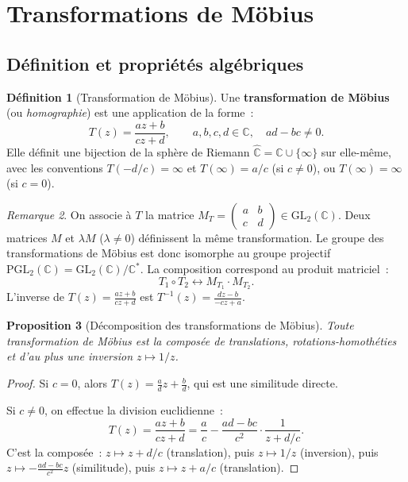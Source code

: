 \documentclass[12pt,a4paper,openany]{book}
\theoremstyle{definition}
\newtheorem{definition}{Définition}[chapter]
\theoremstyle{plain}
\newtheorem{proposition}[definition]{Proposition}
\theoremstyle{remark}
\newtheorem{remarque}[definition]{Remarque}
\newcommand{\C}{\mathbb{C}}
\begin{document}
\section{Transformations de Möbius}\label{sec:mobius}

\subsection{Définition et propriétés algébriques}

\begin{definition}[Transformation de Möbius]\label{def:mobius}
Une \textbf{transformation de Möbius} (ou \emph{homographie}) est une application
de la forme~:
\[
  T(z) = \frac{az + b}{cz + d}, \qquad a, b, c, d \in \C, \quad ad - bc \neq 0.
\]
Elle définit une bijection de la sphère de Riemann $\widehat{\C} = \C \cup \{\infty\}$
sur elle-même, avec les conventions $T(-d/c) = \infty$ et $T(\infty) = a/c$
(si $c \neq 0$), ou $T(\infty) = \infty$ (si $c = 0$).
\end{definition}

\begin{remarque}\label{rem:mobius-matrice}
On associe à $T$ la matrice $M_T = \begin{pmatrix} a & b \\ c & d \end{pmatrix}
\in \mathrm{GL}_2(\C)$. Deux matrices $M$ et $\lambda M$ ($\lambda \neq 0$)
définissent la même transformation. Le groupe des transformations de Möbius
est donc isomorphe au groupe projectif $\mathrm{PGL}_2(\C) = \mathrm{GL}_2(\C) / \C^*$.
La composition correspond au produit matriciel~:
\[
  T_1 \circ T_2 \longleftrightarrow M_{T_1} \cdot M_{T_2}.
\]
L'inverse de $T(z) = \frac{az+b}{cz+d}$ est $T^{-1}(z) = \frac{dz - b}{-cz + a}$.
\end{remarque}

\begin{proposition}[Décomposition des transformations de Möbius]\label{prop:mobius-decomp}
Toute transformation de Möbius est la composée de translations, rotations-homothéties
et d'au plus une inversion $z \mapsto 1/z$.
\end{proposition}

\begin{proof}
Si $c = 0$, alors $T(z) = \frac{a}{d}z + \frac{b}{d}$, qui est une similitude directe.

Si $c \neq 0$, on effectue la division euclidienne~:
\[
  T(z) = \frac{az + b}{cz + d} = \frac{a}{c} - \frac{ad - bc}{c^2} \cdot \frac{1}{z + d/c}.
\]
C'est la composée~: $z \mapsto z + d/c$ (translation), puis $z \mapsto 1/z$ (inversion),
puis $z \mapsto -\frac{ad-bc}{c^2} z$ (similitude), puis $z \mapsto z + a/c$ (translation).
\end{proof}
\end{document}
